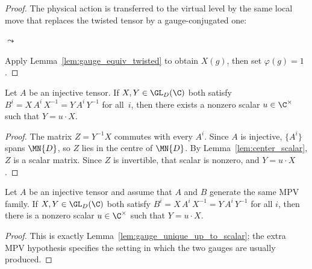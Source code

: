 \begin{proof}\leanok{}
    The physical action is transferred to the virtual level by the same
    local move that replaces the twisted tensor by a gauge-conjugated one:
    \begin{center}
        \qquad $\leadsto$ \qquad
    \end{center}
    Apply Lemma~\ref{lem:gauge_equiv_twisted} to obtain $X(g)$, then
    set $\varphi(g) = 1$.
\end{proof}

\begin{lemma}\label{lem:gauge_unique_up_to_scalar}
    \leanok
    Let $A$ be an injective tensor.
    If $X, Y \in \GL_{D}(\C)$ both satisfy
    $B^i = X\, A^i\, X^{-1} = Y\, A^i\, Y^{-1}$
    for all~$i$, then there exists a nonzero scalar $u \in \C^{\times}$
    such that $Y = u \cdot X$.
\end{lemma}

\begin{proof}\leanok{}
    The matrix $Z = Y^{-1} X$ commutes with every $A^i$.
    Since $A$ is injective, $\{A^i\}$ spans $\MN{D}$, so $Z$
    lies in the centre of $\MN{D}$.
    By Lemma~\ref{lem:center_scalar}, $Z$ is a scalar matrix.
    Since $Z$ is invertible, that scalar is nonzero, and
    $Y = u \cdot X$.
\end{proof}

\begin{theorem}
    \label{thm:gauge_unique_up_to_scalar_sameMPV}
    \leanok
    Let $A$ be an injective tensor and assume that $A$ and $B$ generate the
    same MPV family.
    If $X, Y \in \GL_{D}(\C)$ both satisfy
    $B^i = X\, A^i\, X^{-1} = Y\, A^i\, Y^{-1}$ for all $i$, then there is a
    nonzero scalar $u \in \C^{\times}$ such that $Y = u \cdot X$.
\end{theorem}

\begin{proof}
    \leanok
    This is exactly Lemma~\ref{lem:gauge_unique_up_to_scalar}; the extra MPV
    hypothesis specifies the setting in which the two gauges are usually
    produced.
\end{proof}

